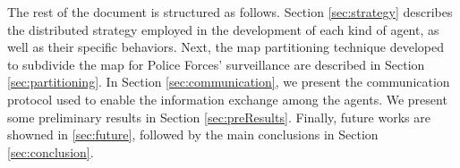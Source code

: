 The rest of the document is structured as follows. Section \ref{sec:strategy} describes the distributed strategy employed in the development of each kind of agent, as well as their specific behaviors. Next, the map partitioning technique developed to subdivide the map for Police Forces' surveillance are described in Section \ref{sec:partitioning}. In Section \ref{sec:communication}, we present the communication protocol used to enable the information exchange among the agents. We present some preliminary results in Section \ref{sec:preResults}. Finally, future works are showned in \ref{sec:future}, followed by the main conclusions in Section \ref{sec:conclusion}.
